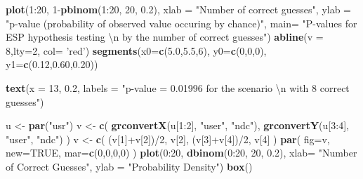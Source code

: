 \documentclass[]{tufte-handout}
\newenvironment{Shaded}{}{}
\newcommand{\KeywordTok}[1]{\textcolor[rgb]{0.00,0.44,0.13}{\textbf{{#1}}}}
\newcommand{\DataTypeTok}[1]{\textcolor[rgb]{0.56,0.13,0.00}{{#1}}}
\newcommand{\DecValTok}[1]{\textcolor[rgb]{0.25,0.63,0.44}{{#1}}}
\newcommand{\FloatTok}[1]{\textcolor[rgb]{0.25,0.63,0.44}{{#1}}}
\newcommand{\CharTok}[1]{\textcolor[rgb]{0.25,0.44,0.63}{{#1}}}
\newcommand{\StringTok}[1]{\textcolor[rgb]{0.25,0.44,0.63}{{#1}}}
\newcommand{\OtherTok}[1]{\textcolor[rgb]{0.00,0.44,0.13}{{#1}}}
\newcommand{\NormalTok}[1]{{#1}}
\begin{document}
\begin{Shaded}
\begin{Highlighting}[]
\KeywordTok{plot}\NormalTok{(}\DecValTok{1}\NormalTok{:}\DecValTok{20}\NormalTok{, }\DecValTok{1}\NormalTok{-}\KeywordTok{pbinom}\NormalTok{(}\DecValTok{1}\NormalTok{:}\DecValTok{20}\NormalTok{, }\DecValTok{20}\NormalTok{, }\FloatTok{0.2}\NormalTok{), }\DataTypeTok{xlab =} \StringTok{"Number of correct guesses"}\NormalTok{, }\DataTypeTok{ylab =} \StringTok{"p-value (probability of observed value occuring by chance)"}\NormalTok{, }\DataTypeTok{main=} \StringTok{"P-values for ESP hypothesis testing }\CharTok{\textbackslash{}n}\StringTok{ by the number of correct guesses"}\NormalTok{)}
\KeywordTok{abline}\NormalTok{(}\DataTypeTok{v =} \DecValTok{8}\NormalTok{,}\DataTypeTok{lty=}\DecValTok{2}\NormalTok{, }\DataTypeTok{col=} \StringTok{'red'}\NormalTok{)}
\KeywordTok{segments}\NormalTok{(}\DataTypeTok{x0=}\KeywordTok{c}\NormalTok{(}\FloatTok{5.0}\NormalTok{,}\FloatTok{5.5}\NormalTok{,}\DecValTok{6}\NormalTok{), }\DataTypeTok{y0=}\KeywordTok{c}\NormalTok{(}\DecValTok{0}\NormalTok{,}\DecValTok{0}\NormalTok{,}\DecValTok{0}\NormalTok{), }\DataTypeTok{y1=}\KeywordTok{c}\NormalTok{(}\FloatTok{0.12}\NormalTok{,}\FloatTok{0.60}\NormalTok{,}\FloatTok{0.20}\NormalTok{)) }

\KeywordTok{text}\NormalTok{(}\DataTypeTok{x =} \DecValTok{13}\NormalTok{, }\FloatTok{0.2}\NormalTok{, }\DataTypeTok{labels =} \StringTok{"p-value = 0.01996 for the scenario }\CharTok{\textbackslash{}n}\StringTok{ with 8 correct guesses"}\NormalTok{)}

\NormalTok{u <-}\StringTok{ }\KeywordTok{par}\NormalTok{(}\StringTok{"usr"}\NormalTok{)}
\NormalTok{v <-}\StringTok{ }\KeywordTok{c}\NormalTok{(}
  \KeywordTok{grconvertX}\NormalTok{(u[}\DecValTok{1}\NormalTok{:}\DecValTok{2}\NormalTok{], }\StringTok{"user"}\NormalTok{, }\StringTok{"ndc"}\NormalTok{),}
  \KeywordTok{grconvertY}\NormalTok{(u[}\DecValTok{3}\NormalTok{:}\DecValTok{4}\NormalTok{], }\StringTok{"user"}\NormalTok{, }\StringTok{"ndc"}\NormalTok{)}
\NormalTok{)}
\NormalTok{v <-}\StringTok{ }\KeywordTok{c}\NormalTok{( (v[}\DecValTok{1}\NormalTok{]+v[}\DecValTok{2}\NormalTok{])/}\DecValTok{2}\NormalTok{, v[}\DecValTok{2}\NormalTok{], (v[}\DecValTok{3}\NormalTok{]+v[}\DecValTok{4}\NormalTok{])/}\DecValTok{2}\NormalTok{, v[}\DecValTok{4}\NormalTok{] )}
\KeywordTok{par}\NormalTok{( }\DataTypeTok{fig=}\NormalTok{v, }\DataTypeTok{new=}\OtherTok{TRUE}\NormalTok{, }\DataTypeTok{mar=}\KeywordTok{c}\NormalTok{(}\DecValTok{0}\NormalTok{,}\DecValTok{0}\NormalTok{,}\DecValTok{0}\NormalTok{,}\DecValTok{0}\NormalTok{) )}
\KeywordTok{plot}\NormalTok{(}\DecValTok{0}\NormalTok{:}\DecValTok{20}\NormalTok{, }\KeywordTok{dbinom}\NormalTok{(}\DecValTok{0}\NormalTok{:}\DecValTok{20}\NormalTok{, }\DecValTok{20}\NormalTok{, }\FloatTok{0.2}\NormalTok{), }\DataTypeTok{xlab=} \StringTok{"Number of Correct Guesses"}\NormalTok{, }\DataTypeTok{ylab =} \StringTok{"Probability Density"}\NormalTok{)}
\KeywordTok{box}\NormalTok{()}
\end{Highlighting}
\end{Shaded}
\end{document}
